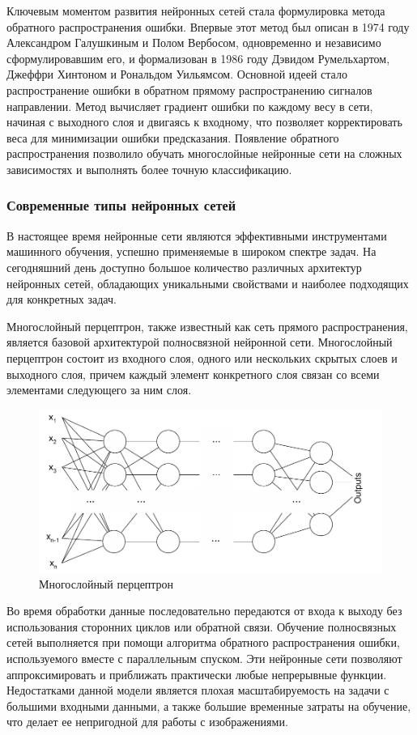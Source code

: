  Ключевым моментом развития нейронных сетей стала формулировка метода обратного распространения ошибки. Впервые этот метод был описан в 1974 году Александром Галушкиным и Полом Вербосом, одновременно и независимо сформулировавшим его, и формализован в 1986 году Дэвидом Румельхартом, Джеффри Хинтоном и Рональдом Уильямсом. Основной идеей стало распространение ошибки в обратном прямому распространению сигналов направлении. Метод вычисляет градиент ошибки по каждому весу в сети, начиная с выходного слоя и двигаясь к входному, что позволяет корректировать веса для минимизации ошибки предсказания. Появление обратного распространения позволило обучать многослойные нейронные сети на сложных зависимостях и выполнять более точную классификацию.
 
 \subsubsection{Современные типы нейронных сетей}
 
 В настоящее время нейронные сети являются эффективными инструментами машинного обучения, успешно применяемые в широком спектре задач. На сегодняшний день доступно большое количество различных архитектур нейронных сетей, обладающих уникальными свойствами и наиболее подходящих для конкретных задач.
 
 Многослойный перцептрон, также известный как сеть прямого распространения, является базовой архитектурой полносвязной нейронной сети. Многослойный перцептрон состоит из входного слоя, одного или нескольких скрытых слоев и выходного слоя, причем каждый элемент конкретного слоя связан со всеми элементами следующего за ним слоя.
 
\begin{figure}[h]
	\centering
	\includegraphics[width=0.7\linewidth]{images/MLP}
	\caption{Многослойный перцептрон}
	\label{fig:mlp}
\end{figure}

Во время обработки данные последовательно передаются от входа к выходу без использования сторонних циклов или обратной связи. Обучение полносвязных сетей выполняется при помощи алгоритма обратного распространения ошибки, используемого вместе с параллельным спуском.  Эти нейронные сети позволяют аппроксимировать и приближать практически любые непрерывные функции. Недостатками данной модели является плохая масштабируемость на задачи с большими входными данными, а также большие временные затраты на обучение, что делает ее непригодной для работы с изображениями.

